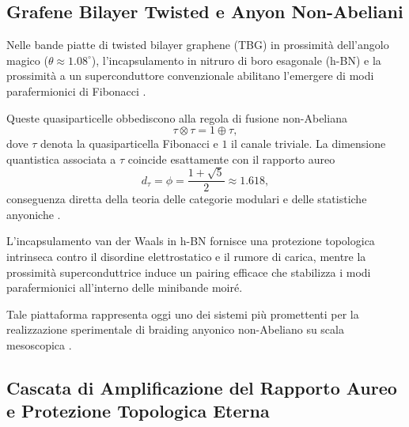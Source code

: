 \documentclass[11pt,a4paper]{article}
\let\oldcite\cite
\renewcommand{\cite}{\protect\oldcite}
\theoremstyle{plain}
\theoremstyle{definition}
\begin{document}
\vspace{0.3cm}



\subsection{Grafene Bilayer Twisted e Anyon Non-Abeliani}

Nelle bande piatte di twisted bilayer graphene (TBG) in prossimità dell'angolo magico ($\theta \approx 1.08^\circ$), l'incapsulamento in nitruro di boro esagonale (h-BN) e la prossimità a un superconduttore convenzionale abilitano l'emergere di modi parafermionici di Fibonacci \cite{Liu2025, Xu2024}. 


\vspace{0.2cm}

Queste quasiparticelle obbediscono alla regola di fusione non-Abeliana
\begin{equation}
\tau \otimes \tau = 1 \oplus \tau,
\label{eq:fib_fusion}
\end{equation}
dove $\tau$ denota la quasiparticella Fibonacci e $1$ il canale triviale. La dimensione quantistica associata a $\tau$ coincide esattamente con il rapporto aureo
\begin{equation}
d_\tau = \phi = \frac{1 + \sqrt{5}}{2} \approx 1.618,
\label{eq:golden_dimension}
\end{equation}
conseguenza diretta della teoria delle categorie modulari e delle statistiche anyoniche \cite{Trebst2008, Nayak2008}.


\vspace{0.2cm}

L'incapsulamento van der Waals in h-BN fornisce una protezione topologica intrinseca contro il disordine elettrostatico e il rumore di carica, mentre la prossimità superconduttrice induce un pairing efficace che stabilizza i modi parafermionici all'interno delle minibande moiré.


\vspace{0.2cm}


Tale piattaforma rappresenta oggi uno dei sistemi più promettenti per la realizzazione sperimentale di braiding anyonico non-Abeliano su scala mesoscopica \cite{Xu2024}.




\vspace{0.3cm}


\subsection{Cascata di Amplificazione del Rapporto Aureo e Protezione Topologica Eterna}
\end{document}
